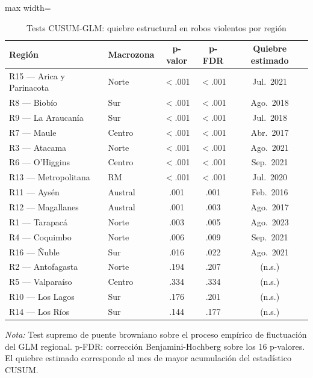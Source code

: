 \documentclass[12pt,a4paper]{article}
\newcommand{\tablenote}[1]{%
  \vspace{2pt}%
  \begin{minipage}{\linewidth}%
    \footnotesize\textit{Nota:} #1%
  \end{minipage}%
}
\begin{document}
\begin{table}[H]
\centering
\caption{Tests CUSUM-GLM: quiebre estructural en robos violentos por regi\'on}
\label{tab:cusum}
\footnotesize
\begin{adjustbox}{max width=\columnwidth}
\begin{tabular}{llccc}
\toprule
\textbf{Regi\'on} & \textbf{Macrozona} & \textbf{p-valor} & \textbf{p-FDR} & \textbf{Quiebre estimado} \\
\midrule
R15 --- Arica y Parinacota & Norte   & $<$.001  & $<$.001 & Jul.\ 2021 \\
R8 --- Biob\'io            & Sur     & $<$.001  & $<$.001 & Ago.\ 2018 \\
R9 --- La Araucan\'ia      & Sur     & $<$.001  & $<$.001 & Jul.\ 2018 \\
R7 --- Maule               & Centro  & $<$.001  & $<$.001 & Abr.\ 2017 \\
R3 --- Atacama             & Norte   & $<$.001  & $<$.001 & Ago.\ 2021 \\
R6 --- O'Higgins           & Centro  & $<$.001  & $<$.001 & Sep.\ 2021 \\
R13 --- Metropolitana      & RM      & $<$.001  & $<$.001 & Jul.\ 2020 \\
R11 --- Ays\'en            & Austral & .001     & .001    & Feb.\ 2016 \\
R12 --- Magallanes         & Austral & .001     & .003    & Ago.\ 2017 \\
R1 --- Tarapac\'a          & Norte   & .003     & .005    & Ago.\ 2023 \\
R4 --- Coquimbo            & Norte   & .006     & .009    & Sep.\ 2021 \\
R16 --- \~Nuble            & Sur     & .016     & .022    & Ago.\ 2021 \\
\midrule
R2 --- Antofagasta         & Norte   & .194     & .207    & (n.s.) \\
R5 --- Valpara\'iso        & Centro  & .334     & .334    & (n.s.) \\
R10 --- Los Lagos          & Sur     & .176     & .201    & (n.s.) \\
R14 --- Los R\'ios         & Sur     & .144     & .177    & (n.s.) \\
\bottomrule
\end{tabular}
\end{adjustbox}
\tablenote{Test supremo de puente browniano sobre el proceso emp\'irico de fluctuaci\'on
del GLM regional. p-FDR: correcci\'on Benjamini-Hochberg sobre los 16 p-valores. El
quiebre estimado corresponde al mes de mayor acumulaci\'on del estad\'istico CUSUM.}
\end{table}
\end{document}
